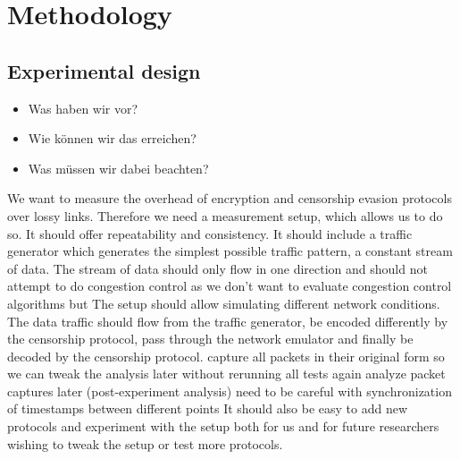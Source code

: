 
\chapter{Methodology}
\label{chap:methodology}

\section{Experimental design}
\begin{itemize}
	\item Was haben wir vor?
	\item Wie können wir das erreichen?
	\item Was müssen wir dabei beachten?
\end{itemize}
We want to measure the overhead of encryption and censorship evasion protocols over lossy links.
Therefore we need a measurement setup, which allows us to do so.
It should offer repeatability and consistency.
It should include a traffic generator which generates the simplest possible traffic pattern, a constant stream of data.
The stream of data should only flow in one direction and should not attempt to do congestion control as we don't want to evaluate congestion control algorithms but 
The setup should allow simulating different network conditions.
The data traffic should flow from the traffic generator, be encoded differently by the censorship protocol, pass through the network emulator and finally be decoded by the censorship protocol.
capture all packets in their original form so we can tweak the analysis later without rerunning all tests again
analyze packet captures later (post-experiment analysis)
need to be careful with synchronization of timestamps between different points
It should also be easy to add new protocols and experiment with the setup both for us and for future researchers wishing to tweak the setup or test more protocols.

